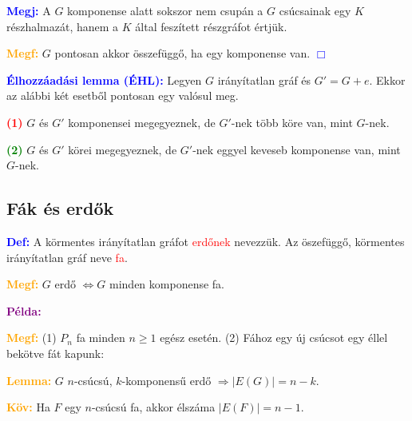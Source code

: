 \documentclass[../szamtud.tex]{subfiles}
\begin{document}
        \textcolor{blue}{\textbf{Megj:}} A $G$ komponense alatt sokszor nem csupán a $G$ csúcsainak egy $K$ részhalmazát, hanem a $K$ által feszített részgráfot értjük.

        \textcolor{orange}{\textbf{Megf:}} $G$ pontosan akkor összefüggő, ha egy komponense van. \textcolor{blue}{$\Box$} 

        \textcolor{blue}{\textbf{Élhozzáadási lemma (ÉHL):}} Legyen $G$ irányítatlan gráf és $G' = G + e$. Ekkor az alábbi két esetből pontosan egy valósul meg.

        \textcolor{red}{\textbf{(1)}} $G$ és $G'$ komponensei megegyeznek, de $G'$-nek több köre van, mint $G$-nek.

        \textcolor{green}{\textbf{(2)}} $G$ és $G'$ körei megegyeznek, de $G'$-nek eggyel keveseb komponense van, mint $G$-nek.

    \subsection{Fák és erdők}

        \textcolor{blue}{\textbf{Def:}} A körmentes irányítatlan gráfot \textcolor{red}{erdőnek} nevezzük. Az öszefüggő, körmentes irányítatlan gráf neve \textcolor{red}{fa}.

        \textcolor{orange}{\textbf{Megf:}} $G$ erdő $\Longleftrightarrow  G$ minden komponense fa.

        \textcolor{purple}{\textbf{Példa:}}

        \textcolor{orange}{\textbf{Megf:}} (1) $P_n$ fa minden $n \geq 1$ egész esetén. (2) Fához egy új csúcsot egy éllel bekötve fát kapunk:

        \textcolor{orange}{\textbf{Lemma:}} $G$ $n$-csúcsú, $k$-komponensű erdő $\Rightarrow |E(G)| = n-k$.


        \textcolor{orange}{\textbf{Köv:}} Ha $F$ egy $n$-csúcsú fa, akkor élszáma $|E(F)|=n-1$.

\end{document}
